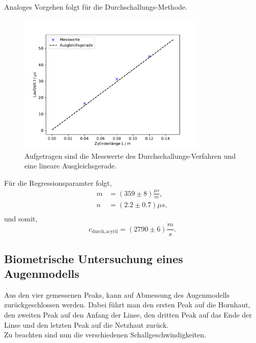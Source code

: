 Analoges Vorgehen folgt für die Durchschallungs-Methode.
\begin{figure}[H]
    \centering
    \includegraphics[width=0.8\textwidth]{plots/laufzeit_durch.pdf}
    \caption{Aufgetragen sind die Messwerte des Durchschallungs-Verfahren und eine lineare
    Ausgleichsgerade.}
\end{figure}

Für die Regressionsparamter folgt,
\begin{align*}
    m&=(359\pm8)\frac{\mu s}{m},\\
    n&=(2.2\pm0.7)\mu s,\\
\end{align*}
und somit,
\begin{equation}
    c_{\text{durch,acyril}}=(2790\pm6)\frac{m}{s}.
\end{equation}
\subsection{Biometrische Untersuchung eines Augenmodells}
Aus den vier gemessenen Peaks, kann auf Abmessung des Augenmodells zurückgeschlossen werden.
Dabei führt man den ersten Peak auf die Hornhaut, den zweiten Peak auf den Anfang der Linse, den dritten Peak
auf das Ende der Linse und den letzten Peak auf die Netzhaut zurück.\\
Zu beachten sind nun die verschiedenen Schallgeschwindigkeiten.

